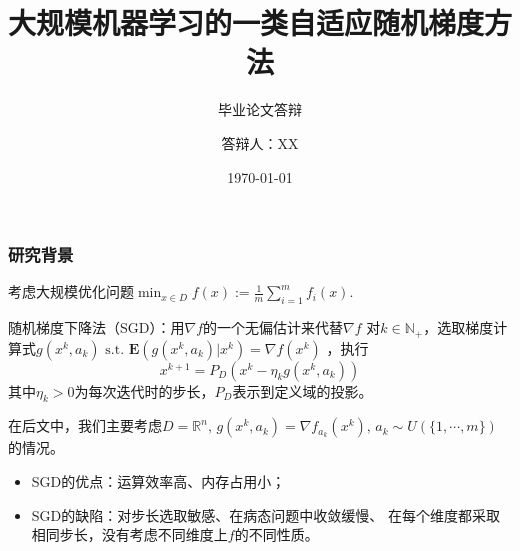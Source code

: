 \documentclass[9pt,aspectratio=169]{beamer}
\title{大规模机器学习的一类自适应随机梯度方法}
\subtitle{毕业论文答辩}
\date{\today}
\author{答辩人：XX}
\begin{document}
\begin{frame}
	\titlepage
\end{frame}
\begin{frame}
\frametitle{研究背景}
考虑大规模优化问题$\min_{x\in D} f(x):=\frac{1}{m}\sum_{i=1}^{m}f_i(x).$%
\begin{block}{随机梯度下降法（SGD）：用$\nabla f$的一个无偏估计来代替$\nabla f$}
	对$k\in \mathbb{N}_+$，选取梯度计算式$g(x^k,a_k) \,\,\mathrm{s.t.}\,\,\mathbf{E}(g(x^k,a_k)|x^k)=\nabla f(x^k)$
，执行
	\begin{equation}
		x^{k+1}=P_D(x^k-\eta_k g(x^k,a_k))
	\end{equation}
	其中$\eta_k>0$为每次迭代时的步长，$P_D$表示到定义域的投影。
\end{block}
\vspace{0.2cm}
在后文中，我们主要考虑$D=\mathbb{R}^{n},\,g(x^k,a_k)=\nabla f_{a_{k}}\left(x^{k}\right),\,a_k \sim U (\{1,\cdots,m\})$
的情况。
\vspace{0.3cm}
\begin{itemize}
	\item SGD的优点：运算效率高、内存占用小；
	\item SGD的缺陷：对步长选取敏感、在病态问题中收敛缓慢、%
	在每个维度都采取相同步长，没有考虑不同维度上$f$的不同性质。	
\end{itemize}

\end{frame}
\end{document}
